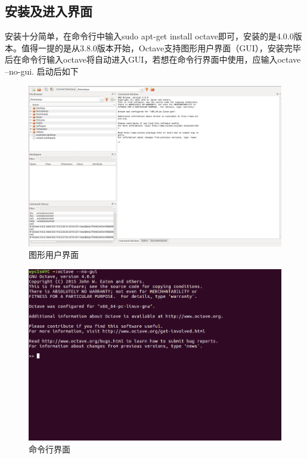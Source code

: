 \documentclass[a4paper,11pt]{ctexart}
\begin{document}
\subsection{安装及进入界面}
安装十分简单，在命令行中输入sudo apt-get install octave即可，安装的是4.0.0版本。值得一提的是从3.8.0版本开始，Octave支持图形用户界面（GUI），安装完毕后在命令行输入octave将自动进入GUI，若想在命令行界面中使用，应输入octave --no-gui.
启动后如下
\begin{figure}[H]
	\begin{center}
		\includegraphics[width=.9\textwidth]{octave.png}
	\end{center}
	\caption{图形用户界面}
\end{figure}
\begin{figure}[H]
	\begin{center}
		\includegraphics[width=.9\textwidth]{octave_no_gui.png}
	\end{center}
	\caption{命令行界面}
\end{figure}
\end{document}
